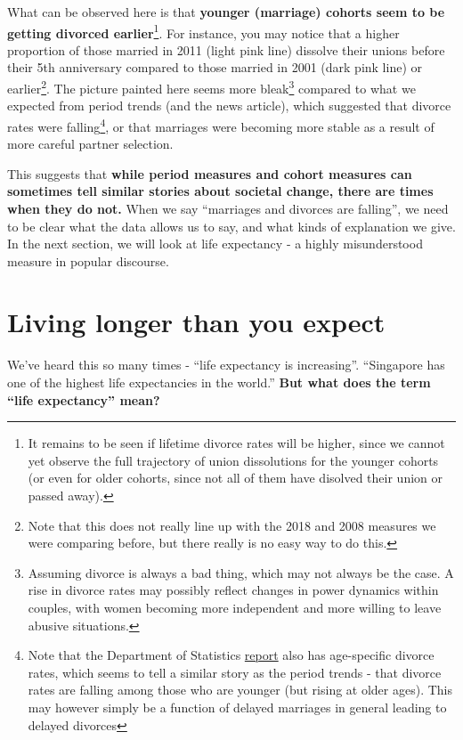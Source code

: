 \documentclass[openany]{book}
\let\rmarkdownfootnote\footnote%
\def\footnote{\protect\rmarkdownfootnote}
\begin{document}
What can be observed here is that \textbf{younger (marriage) cohorts
seem to be getting divorced earlier}\footnote{It remains to be seen if
  lifetime divorce rates will be higher, since we cannot yet observe the
  full trajectory of union dissolutions for the younger cohorts (or even
  for older cohorts, since not all of them have disolved their union or
  passed away).}. For instance, you may notice that a higher proportion
of those married in 2011 (light pink line) dissolve their unions before
their 5th anniversary compared to those married in 2001 (dark pink line)
or earlier\footnote{Note that this does not really line up with the 2018
  and 2008 measures we were comparing before, but there really is no
  easy way to do this.}. The picture painted here seems more
bleak\footnote{Assuming divorce is always a bad thing, which may not
  always be the case. A rise in divorce rates may possibly reflect
  changes in power dynamics within couples, with women becoming more
  independent and more willing to leave abusive situations.} compared to
what we expected from period trends (and the news article), which
suggested that divorce rates were falling\footnote{Note that the
  Department of Statistics
  \href{https://www.singstat.gov.sg/-/media/files/publications/population/smd2018.pdf}{report}
  also has age-specific divorce rates, which seems to tell a similar
  story as the period trends - that divorce rates are falling among
  those who are younger (but rising at older ages). This may however
  simply be a function of delayed marriages in general leading to
  delayed divorces}, or that marriages were becoming more stable as a
result of more careful partner selection.

This suggests that \textbf{while period measures and cohort measures can
sometimes tell similar stories about societal change, there are times
when they do not.} When we say ``marriages and divorces are falling'',
we need to be clear what the data allows us to say, and what kinds of
explanation we give. In the next section, we will look at life
expectancy - a highly misunderstood measure in popular discourse.

\section{Living longer than you
expect}\label{living-longer-than-you-expect}

We've heard this so many times - ``life expectancy is increasing''.
``Singapore has one of the highest life expectancies in the world.''
\textbf{But what does the term ``life expectancy'' mean?}
\end{document}
